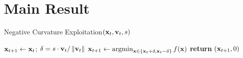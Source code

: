 
\section{Main Result}\label{sec:results}






\begin{algorithm}[t]
\caption{Negative Curvature Exploitation$\left(\mathbf{x}_t, \mathbf{v}_t, s\right)$}\label{algo:NCE}
\begin{algorithmic}[1]
\STATE $\mathbf{x}_{t+1} \leftarrow \mathbf{x}_t$;
\ELSE
\STATE $\delta = s\cdot \mathbf{v}_t/\left\|{\mathbf{v}_t}\right\|$
\STATE $\x_{t+1} \leftarrow \argmin_{\x \in \{\x_t + \delta, \x_t - \delta\}} f(\x)$
\ENDIF
\STATE \textbf{return} $(\mathbf{x}_{t+1}, 0)$
\end{algorithmic}
\end{algorithm}











